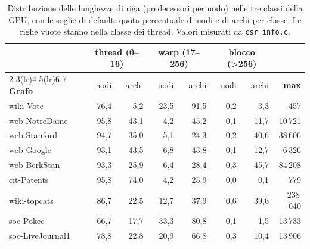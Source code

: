 \documentclass[11pt,a4paper]{article}
\begin{document}
\begin{table}[h]
\centering
\caption{Distribuzione delle lunghezze di riga (predecessori per nodo) nelle
tre classi della GPU, con le soglie di default: quota percentuale di nodi e di
archi per classe. Le righe vuote stanno nella classe dei thread. Valori
misurati da \texttt{csr\_info.c}.}
\label{tab:bins}
\begin{tabular}{@{}lrrrrrrr@{}}
\toprule
& \multicolumn{2}{c}{\textbf{thread (0--16)}} &
\multicolumn{2}{c}{\textbf{warp (17--256)}} &
\multicolumn{2}{c}{\textbf{blocco (>256)}} & \\
\cmidrule(lr){2-3}\cmidrule(lr){4-5}\cmidrule(lr){6-7}
\textbf{Grafo} & nodi & archi & nodi & archi & nodi & archi & \textbf{max} \\
\midrule
wiki-Vote        & 76,4 & 5,2  & 23,5 & 91,5 & 0,2 & 3,3  & 457 \\
web-NotreDame    & 95,8 & 43,1 & 4,2  & 45,2 & 0,1 & 11,7 & 10\,721 \\
web-Stanford     & 94,7 & 35,0 & 5,1  & 24,3 & 0,2 & 40,6 & 38\,606 \\
web-Google       & 93,1 & 43,5 & 6,8  & 43,8 & 0,1 & 12,7 & 6\,326 \\
web-BerkStan     & 93,3 & 25,9 & 6,4  & 28,4 & 0,3 & 45,7 & 84\,208 \\
cit-Patents      & 95,8 & 74,0 & 4,2  & 25,9 & 0,0 & 0,1  & 779 \\
wiki-topcats     & 86,7 & 22,5 & 12,7 & 37,9 & 0,6 & 39,6 & 238\,040 \\
soc-Pokec        & 66,7 & 17,7 & 33,3 & 80,8 & 0,1 & 1,5  & 13\,733 \\
soc-LiveJournal1 & 78,8 & 22,8 & 20,9 & 66,8 & 0,3 & 10,4 & 13\,906 \\
\bottomrule
\end{tabular}
\end{table}
\end{document}
